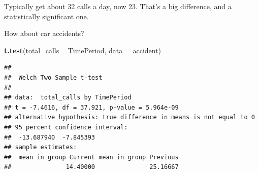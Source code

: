 \documentclass[]{book}
\newenvironment{Shaded}{\begin{snugshade}}{\end{snugshade}}
\newcommand{\DataTypeTok}[1]{\textcolor[rgb]{0.13,0.29,0.53}{#1}}
\newcommand{\DecValTok}[1]{\textcolor[rgb]{0.00,0.00,0.81}{#1}}
\newcommand{\KeywordTok}[1]{\textcolor[rgb]{0.13,0.29,0.53}{\textbf{#1}}}
\newcommand{\NormalTok}[1]{#1}
\newcommand{\OperatorTok}[1]{\textcolor[rgb]{0.81,0.36,0.00}{\textbf{#1}}}
\newcommand{\StringTok}[1]{\textcolor[rgb]{0.31,0.60,0.02}{#1}}
\begin{document}
Typically get about 32 calls a day, now 23. That's a big difference, and a statistically significant one.

How about car accidents?

\begin{Shaded}
\end{Shaded}

\begin{Shaded}
\begin{Highlighting}[]
\KeywordTok{t.test}\NormalTok{(total_calls }\OperatorTok{~}\StringTok{ }\NormalTok{TimePeriod, }\DataTypeTok{data =}\NormalTok{ accident)}
\end{Highlighting}
\end{Shaded}

\begin{verbatim}
## 
##  Welch Two Sample t-test
## 
## data:  total_calls by TimePeriod
## t = -7.4616, df = 37.921, p-value = 5.964e-09
## alternative hypothesis: true difference in means is not equal to 0
## 95 percent confidence interval:
##  -13.687940  -7.845393
## sample estimates:
##  mean in group Current mean in group Previous 
##               14.40000               25.16667
\end{verbatim}
\end{document}
